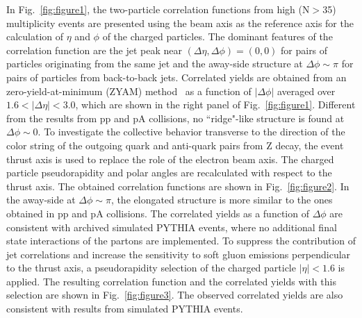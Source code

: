 \documentclass[aps,prl,twocolumn,showpacs,superscriptaddress,groupedaddress]{revtex4}  %
\begin{document}
In Fig.~\ref{fig:figure1}, the two-particle correlation functions from high (N$>$35) multiplicity events are presented using the beam axis as the reference axis for the calculation of $\eta$ and $\phi$ of the charged particles. The dominant features of the correlation function are the jet peak near $(\Delta\eta,\Delta\phi)=(0,0)$ for pairs of particles originating from the same jet and the away-side structure at $\Delta\phi\sim\pi$ for pairs of particles from back-to-back jets. Correlated yields are obtained from an zero-yield-at-minimum (ZYAM) method~\cite{Ajitanand:2005jj} as a function of $|\Delta\phi|$ averaged over $1.6<|\Delta\eta|<3.0$, which are shown in the right panel of Fig.~\ref{fig:figure1}.
Different from the results from pp and pA collisions, no ``ridge"-like structure is found at $\Delta\phi \sim0$. To investigate the collective behavior transverse to the direction of the color string of the outgoing quark and anti-quark pairs from Z decay, the event thrust axis is used to replace the role of the electron beam axis. The charged particle pseudorapidity and polar angles are recalculated with respect to the thrust axis. The obtained correlation functions are shown in Fig.~\ref{fig:figure2}. In the away-side at $\Delta\phi\sim\pi$, the elongated structure is more similar to the ones obtained in pp and pA collisions. The correlated yields as a function of $\Delta\phi$ are consistent with archived simulated PYTHIA events, where no additional final state interactions of the partons are implemented. To suppress the contribution of jet correlations and increase the sensitivity to soft gluon emissions perpendicular to the thrust axis, a pseudorapidity selection of the charged particle $|\eta|<1.6$ is applied. The resulting correlation function and the correlated yields with this selection are shown in Fig.~\ref{fig:figure3}. The observed correlated yields are also consistent with results from simulated PYTHIA events.
\end{document}
